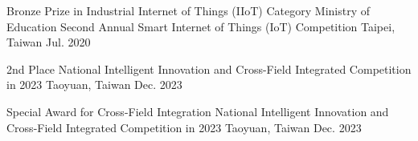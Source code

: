 



\begin{cvhonors}

  \cvhonor
    {Bronze Prize in Industrial Internet of Things (IIoT) Category} %
    {\newline Ministry of Education Second Annual Smart Internet of Things (IoT) Competition} %
    {Taipei, Taiwan} %
    {Jul. 2020} %

  \cvhonor
    {2nd Place} %
    {\newline National Intelligent Innovation and Cross-Field Integrated Competition in 2023} %
    {Taoyuan, Taiwan} %
    {Dec. 2023} %

  \cvhonor
    {Special Award for Cross-Field Integration} %
    {\newline National Intelligent Innovation and Cross-Field Integrated Competition in 2023} %
    {Taoyuan, Taiwan} %
    {Dec. 2023} %

\end{cvhonors}
